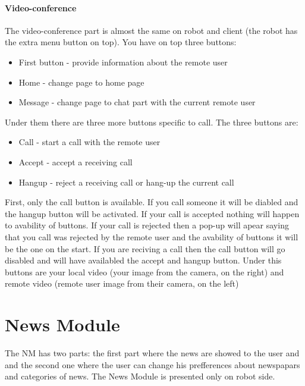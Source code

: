 \paragraph{Video-conference}
\label{sub-sec:ui-callapp-call} 
The video-conference part is almost the same on robot and client (the robot has the extra menu button on top).
You have on top three buttons:
\begin{itemize}
  \item First button - provide information about the remote user
  \item Home - change page to home page
  \item Message - change page to chat part with the current remote user
\end{itemize}
Under them there are three more buttons specific to call. The three buttons are:
\begin{itemize}
  \item Call - start a call with the remote user
  \item Accept - accept a receiving call
  \item Hangup - reject a receiving call or hang-up the current call
\end{itemize}
First, only the call button is available. If you call someone it will be diabled and
the hangup button will be activated. If your call is accepted nothing will happen to avability
of buttons. If your call is rejected then a pop-up will apear saying that you call was rejected
by the remote user and the avability of buttons it will be the one on the start. If you are reciving
a call then the call button will go disabled and will have availabled the accept and hangup button.
Under this buttons are your local video (your image from the camera, on the right) and remote video
(remote user image from their camera, on the left)

\section{News Module}
\label{sec:ui-newsapp}
The NM has two parts: the first part where the news are showed to the user and and the second one
where the user can change his prefferences about newspapars and categories of news. The News Module is
presented only on robot side.

